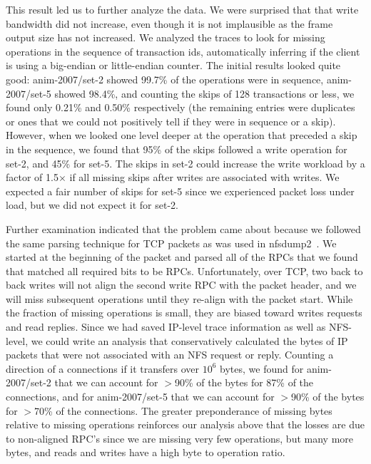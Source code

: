This result led us to further analyze the data.  We were surprised
that that write bandwidth did not increase, even though it is not
implausible as the frame output size has not increased.  We analyzed
the traces to look for missing operations in the sequence of
transaction ids, automatically inferring if the client is using a
big-endian or little-endian counter.  The initial results looked quite
good: anim-2007/set-2 showed 99.7\% of the operations were in sequence,
anim-2007/set-5 showed 98.4\%, and counting the skips of 128 transactions
or less, we found only 0.21\% and 0.50\% respectively (the remaining
entries were duplicates or ones that we could not positively tell if
they were in sequence or a skip).  However, when we looked one level
deeper at the operation that preceded a skip in the sequence, we found
that 95\% of the skips followed a write operation for set-2, and 45\%
for set-5.  The skips in set-2 could increase the write workload by a
factor of 1.5$\times$ if all missing skips after writes are associated with
writes.  We expected a fair number of skips for set-5 since we
experienced packet loss under load, but we did not expect it for
set-2. 

Further examination indicated that the problem came about because we
followed the same parsing technique for TCP packets as was used in
nfsdump2~\cite{ellardTraces}.  We started at the beginning of the
packet and parsed all of the RPCs that we found that matched all
required bits to be RPCs.  Unfortunately, over TCP, two back to back
writes will not align the second write RPC with the packet header, and
we will miss subsequent operations until they re-align with the packet
start.  While the fraction of missing operations is small, they are
biased toward writes requests and read replies. Since we had saved
IP-level trace information as well as NFS-level, we could write an
analysis that conservatively calculated the bytes of IP packets that
were not associated with an NFS request or reply.  Counting a
direction of a connections if it transfers over $10^6$ bytes, we found
for anim-2007/set-2 that we can account for $>$90\% of the bytes for
87\% of the connections, and for anim-2007/set-5 that we can account
for $>$90\% of the bytes for $>$70\% of the connections.  The greater
preponderance of missing bytes relative to missing operations
reinforces our analysis above that the losses are due to non-aligned
RPC's since we are missing very few operations, but many more bytes,
and reads and writes have a high byte to operation ratio.

